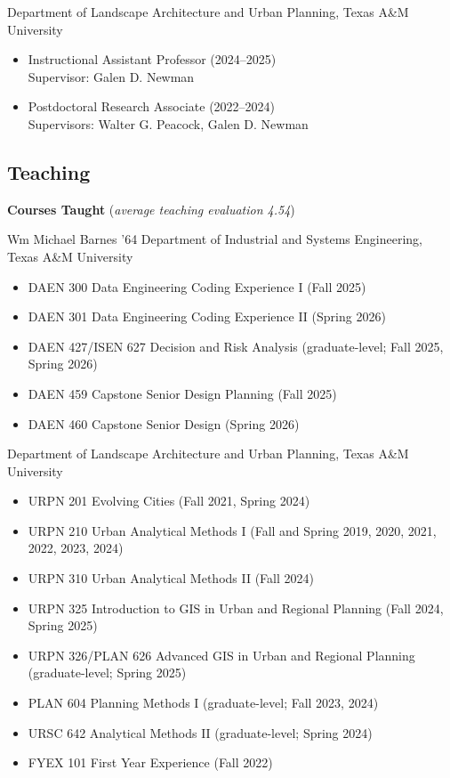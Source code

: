 \documentclass[11pt,oneside]{article}
\begin{document}
\vspace{3pt}

{Department of Landscape Architecture and Urban Planning, Texas A\&M University}\\
\begin{itemize}[leftmargin=20pt]
\item Instructional Assistant Professor (2024--2025)\\
      Supervisor: Galen D. Newman
\item Postdoctoral Research Associate (2022--2024)\\
      Supervisors: Walter G. Peacock, Galen D. Newman
\end{itemize}

\subsection*{Teaching}

\textbf{Courses Taught} (\emph{average teaching evaluation 4.54})

\vspace{3pt}

{Wm Michael Barnes ’64 Department of Industrial and Systems Engineering, Texas A\&M University}
\begin{itemize}[leftmargin=20pt]
\item DAEN 300 Data Engineering Coding Experience I (Fall 2025)
\item DAEN 301 Data Engineering Coding Experience II (Spring 2026)
\item DAEN 427/ISEN 627 Decision and Risk Analysis (graduate-level; Fall 2025, Spring 2026)
\item DAEN 459 Capstone Senior Design Planning (Fall 2025)
\item DAEN 460 Capstone Senior Design (Spring 2026)
\end{itemize}

{Department of Landscape Architecture and Urban Planning, Texas A\&M University}
\begin{itemize}[leftmargin=20pt]
\item URPN 201 Evolving Cities (Fall 2021, Spring 2024)
\item URPN 210 Urban Analytical Methods I (Fall and Spring 2019, 2020, 2021, 2022, 2023, 2024)
\item URPN 310 Urban Analytical Methods II (Fall 2024)
\item URPN 325 Introduction to GIS in Urban and Regional Planning (Fall 2024, Spring 2025)
\item URPN 326/PLAN 626 Advanced GIS in Urban and Regional Planning (graduate-level; Spring 2025)
\item PLAN 604 Planning Methods I (graduate-level; Fall 2023, 2024)
\item URSC 642 Analytical Methods II (graduate-level; Spring 2024)
\item FYEX 101 First Year Experience (Fall 2022)
\end{itemize}
\end{document}
